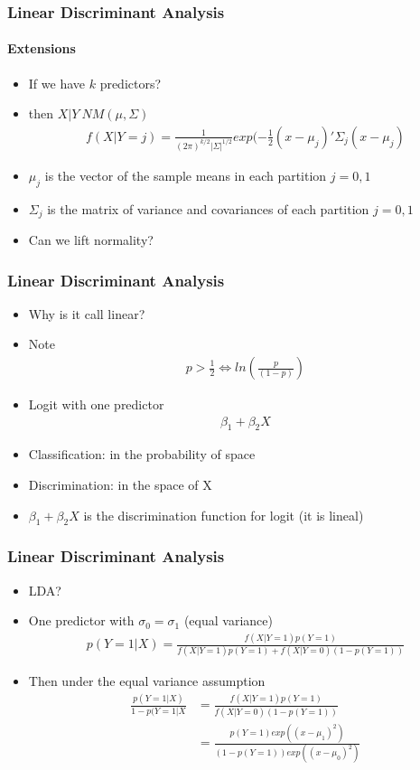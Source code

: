 \documentclass[
  shownotes,
  xcolor={svgnames},
  hyperref={colorlinks,citecolor=DarkBlue,linkcolor=DarkRed,urlcolor=DarkBlue}
  , aspectratio=169]{beamer}
\begin{document}
\begin{frame}[fragile]
\frametitle{Linear Discriminant Analysis}
\framesubtitle{Extensions}

\begin{itemize}
    \item If we have $k$ predictors?
    \medskip
    \item then $X|Y~NM(\mu,\Sigma)$
    \begin{align}
    f(X|Y=j) = \frac{1}{(2\pi)^{k/2}|\Sigma|^{1/2}}exp(-\frac{1}{2}(x-\mu_j)'\Sigma_j(x-\mu_j)
    \end{align}
    \item $\mu_j$ is the vector of the sample means in each partition $j=0,1$
    \medskip
    \item $\Sigma_j$ is the matrix of variance and covariances of each partition $j=0,1$
    \medskip
    \item Can we lift normality? 
    \end{itemize}
\end{frame}
\begin{frame}[fragile]
\frametitle{Linear Discriminant Analysis}

\begin{itemize}
  \item Why is it call linear?
  \item Note
  \begin{align}
    p>\frac{1}{2} \iff ln(\frac{p}{(1-p)})
  \end{align}
  \item Logit with one predictor
  \begin{align}
  \beta_1 + \beta_2 X
  \end{align}
  \item Classification: in the probability of space
  \item Discrimination: in the space of X
  \item $\beta_1 +\beta_2 X$ is the discrimination function for logit (it is lineal)
\end{itemize}

\end{frame}
\begin{frame}[fragile]
\frametitle{Linear Discriminant Analysis}
\begin{itemize}
  \item LDA?
  \item One predictor with $\sigma_0 = \sigma_1$ (equal variance)
  \begin{align}
  p (Y=1|X)=\frac{f(X|Y=1)p(Y=1)}{f(X|Y=1)p(Y=1) + f(X|Y=0)(1-p(Y=1))}
  \end{align}
  \item Then under the equal variance assumption
  \begin{align}
  \frac{p (Y=1|X)}{1-p (Y=1|X} &= \frac{f(X|Y=1)p(Y=1)}{f(X|Y=0)(1-p(Y=1))} \\
                                &= \frac{p(Y=1)exp((x-\mu_1)^2)}{(1-p(Y=1))exp((x-\mu_0)^2)} 
  \end{align}
\end{itemize}

\end{frame}
\end{document}
